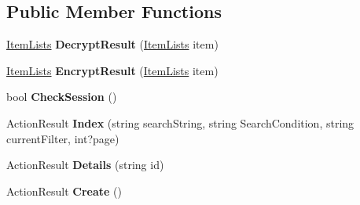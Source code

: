 \subsection*{Public Member Functions}
\begin{DoxyCompactItemize}
\item 
\hyperlink{class_cloud_bread_admin_web_1_1_item_lists}{Item\+Lists} {\bfseries Decrypt\+Result} (\hyperlink{class_cloud_bread_admin_web_1_1_item_lists}{Item\+Lists} item)\hypertarget{class_cloud_bread_admin_web_1_1_controllers_1_1_item_lists_controller_afaead79ac9a7fdb8635d9e16b54756f8}{}\label{class_cloud_bread_admin_web_1_1_controllers_1_1_item_lists_controller_afaead79ac9a7fdb8635d9e16b54756f8}

\item 
\hyperlink{class_cloud_bread_admin_web_1_1_item_lists}{Item\+Lists} {\bfseries Encrypt\+Result} (\hyperlink{class_cloud_bread_admin_web_1_1_item_lists}{Item\+Lists} item)\hypertarget{class_cloud_bread_admin_web_1_1_controllers_1_1_item_lists_controller_a2218b6dceb61b6575c19777cb09a7d77}{}\label{class_cloud_bread_admin_web_1_1_controllers_1_1_item_lists_controller_a2218b6dceb61b6575c19777cb09a7d77}

\item 
bool {\bfseries Check\+Session} ()\hypertarget{class_cloud_bread_admin_web_1_1_controllers_1_1_item_lists_controller_a3db0e41529d4f5be204c1fb2d0c5276e}{}\label{class_cloud_bread_admin_web_1_1_controllers_1_1_item_lists_controller_a3db0e41529d4f5be204c1fb2d0c5276e}

\item 
Action\+Result {\bfseries Index} (string search\+String, string Search\+Condition, string current\+Filter, int?page)\hypertarget{class_cloud_bread_admin_web_1_1_controllers_1_1_item_lists_controller_acaec90a19c92a756dd185ab14faf9b36}{}\label{class_cloud_bread_admin_web_1_1_controllers_1_1_item_lists_controller_acaec90a19c92a756dd185ab14faf9b36}

\item 
Action\+Result {\bfseries Details} (string id)\hypertarget{class_cloud_bread_admin_web_1_1_controllers_1_1_item_lists_controller_a83c27a70a14a94060b079b20bca83cb5}{}\label{class_cloud_bread_admin_web_1_1_controllers_1_1_item_lists_controller_a83c27a70a14a94060b079b20bca83cb5}

\item 
Action\+Result {\bfseries Create} ()\hypertarget{class_cloud_bread_admin_web_1_1_controllers_1_1_item_lists_controller_ae746a6b5bd4045b9e9baa3af39582c73}{}\label{class_cloud_bread_admin_web_1_1_controllers_1_1_item_lists_controller_ae746a6b5bd4045b9e9baa3af39582c73}


\end{DoxyCompactItemize}
